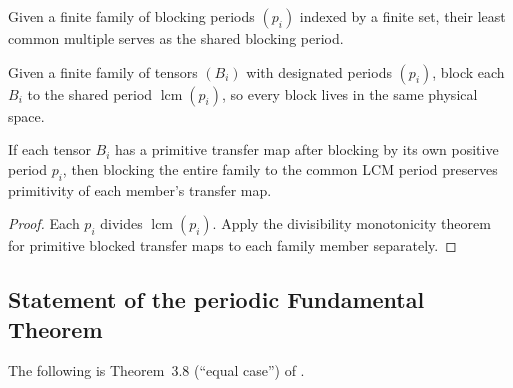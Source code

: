 \begin{definition}
    \label{def:lcm_period}
    \leanok
    Given a finite family of blocking periods $(p_i)$ indexed by a finite set,
    their least common multiple serves as the shared blocking period.
\end{definition}

\begin{definition}
    \label{def:common_period_blocking}
    \leanok
    Given a finite family of tensors $(B_i)$ with designated periods $(p_i)$,
    block each $B_i$ to the shared period $\operatorname{lcm}(p_i)$, so
    every block lives in the same physical space.
\end{definition}

\begin{theorem}
    \label{thm:common_period_blocking_primitive}
    \leanok
    If each tensor $B_i$ has a primitive transfer map after blocking by its own
    positive period $p_i$, then blocking the entire family to the common
    LCM period preserves primitivity of each member's transfer map.
\end{theorem}

\begin{proof}\leanok
    Each $p_i$ divides $\operatorname{lcm}(p_i)$.
    Apply the divisibility monotonicity theorem for primitive blocked transfer maps
    to each family member separately.
\end{proof}

\subsection{Statement of the periodic Fundamental Theorem}

The following is Theorem~3.8 (``equal case'') of \cite{DeLasCuevas2017Irreducible}.

